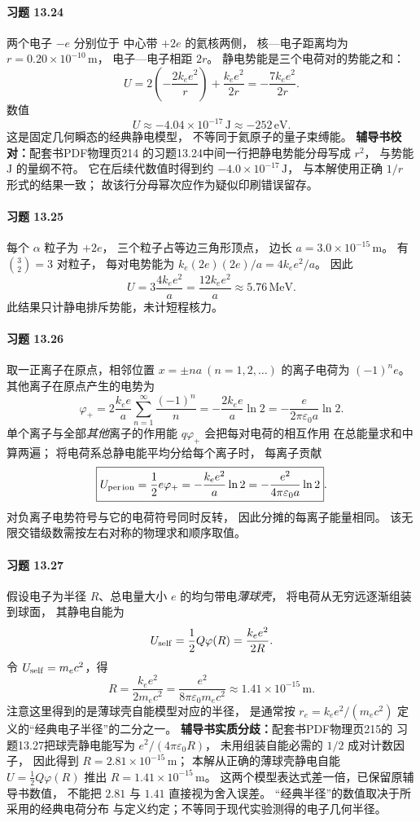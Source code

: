 \paragraph{习题 13.24}
两个电子 \(-e\) 分别位于
中心带 \(+2e\) 的氦核两侧，
核—电子距离均为
\(r=0.20\times10^{-10}\,\mathrm m\)，
电子—电子相距 \(2r\)。
静电势能是三个电荷对的势能之和：
\[
 U=2\left(-\frac{2k_ee^2}{r}\right)
 +\frac{k_ee^2}{2r}
 =-\frac{7k_ee^2}{2r}.
\]
数值
\[
 \boxed{U\approx-4.04\times10^{-17}\,\mathrm J
 \approx-252\,\mathrm{eV}}.
\]
这是固定几何瞬态的经典静电模型，
不等同于氦原子的量子束缚能。
\textbf{辅导书校对：}配套书PDF物理页214
的习题13.24中间一行把静电势能分母写成 \(r^2\)，
与势能 \(\mathrm J\) 的量纲不符。
它在后续代数值时得到约 \(-4.0\times10^{-17}\,\mathrm J\)，
与本解使用正确 \(1/r\) 形式的结果一致；
故该行分母幂次应作为疑似印刷错误留存。

\paragraph{习题 13.25}
每个 \(\alpha\) 粒子为 \(+2e\)，
三个粒子占等边三角形顶点，
边长 \(a=3.0\times10^{-15}\,\mathrm m\)。
有 \(\binom32=3\) 对粒子，
每对电势能为
\(k_e(2e)(2e)/a=4k_ee^2/a\)。
因此
\[
 \boxed{U=3\frac{4k_ee^2}{a}
 =\frac{12k_ee^2}{a}\approx5.76\,\mathrm{MeV}}.
\]
此结果只计静电排斥势能，未计短程核力。

\paragraph{习题 13.26}
取一正离子在原点，相邻位置
\(x=\pm na\ (n=1,2,\ldots)\)
的离子电荷为 \((-1)^ne\)。
其他离子在原点产生的电势为
\[
 \varphi_+
 =2\frac{k_ee}{a}\sum_{n=1}^\infty\frac{(-1)^n}{n}
 =-\frac{2k_ee}{a}\ln2
 =\boxed{-\frac{e}{2\pi\varepsilon_0a}\ln2}.
\]
单个离子与全部\emph{其他}离子的作用能
\(q\varphi_+\) 会把每对电荷的相互作用
在总能量求和中算两遍；
将电荷系总静电能平均分给每个离子时，
每离子贡献
\[
 \boxed{U_{\rm per\,ion}=\frac12e\varphi_+
 =-\frac{k_ee^2}{a}\ln2
 =-\frac{e^2}{4\pi\varepsilon_0a}\ln2}.
\]
对负离子电势符号与它的电荷符号同时反转，
因此分摊的每离子能量相同。
该无限交错级数需按左右对称的物理求和顺序取值。

\paragraph{习题 13.27}
假设电子为半径 \(R\)、总电量大小 \(e\)
的均匀带电\emph{薄球壳}，
将电荷从无穷远逐渐组装到球面，
其静电自能为
\[
 U_{\rm self}=\frac12Q\varphi(R)
 =\frac{k_ee^2}{2R}.
\]
令 \(U_{\rm self}=m_ec^2\)，得
\[
 \boxed{R=\frac{k_ee^2}{2m_ec^2}
 =\frac{e^2}{8\pi\varepsilon_0m_ec^2}
 \approx1.41\times10^{-15}\,\mathrm m}.
\]
注意这里得到的是薄球壳自能模型对应的半径，
是通常按 \(r_e=k_ee^2/(m_ec^2)\)
定义的“经典电子半径”的二分之一。
\textbf{辅导书实质分歧：}配套书PDF物理页215的
习题13.27把球壳静电能写为
\(e^2/(4\pi\varepsilon_0R)\)，
未用组装自能必需的 \(1/2\) 成对计数因子，
因此得到 \(R=2.81\times10^{-15}\,\mathrm m\)；
本解从正确的薄球壳静电自能
\(U=\frac12 Q\varphi(R)\) 推出
\(R=1.41\times10^{-15}\,\mathrm m\)。
这两个模型表达式差一倍，已保留原辅导书数值，
不能把 \(2.81\) 与 \(1.41\) 直接视为舍入误差。
“经典半径”的数值取决于所采用的经典电荷分布
与定义约定；不等同于现代实验测得的电子几何半径。

